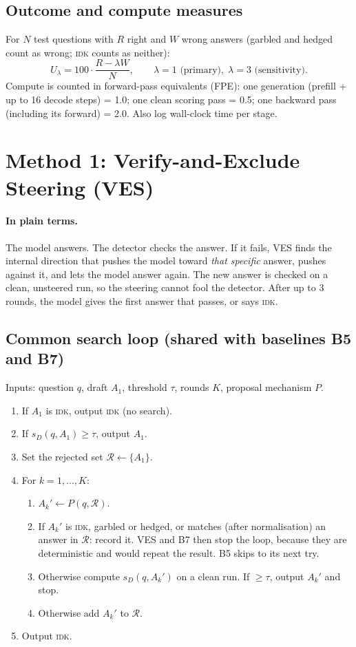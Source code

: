 \documentclass[11pt]{article}
\newcommand{\IDK}{\textsc{idk}}
\newcommand{\sD}{s_{D}}
\begin{document}
\subsection{Outcome and compute measures}
For $N$ test questions with $R$ right and $W$ wrong answers (garbled and hedged count as wrong; \IDK{} counts
as neither):
\[
U_\lambda = 100 \cdot \frac{R - \lambda W}{N}, \qquad \lambda = 1 \text{ (primary)}, \;\lambda = 3 \text{ (sensitivity)}.
\]
Compute is counted in forward-pass equivalents (FPE): one generation (prefill + up to 16 decode steps) = 1.0;
one clean scoring pass = 0.5; one backward pass (including its forward) = 2.0. Also log wall-clock time per stage.

\section{Method 1: Verify-and-Exclude Steering (VES)}

\paragraph{In plain terms.} The model answers. The detector checks the answer. If it fails, VES finds the
internal direction that pushes the model toward \emph{that specific} answer, pushes against it, and lets the
model answer again. The new answer is checked on a clean, unsteered run, so the steering cannot fool the
detector. After up to 3 rounds, the model gives the first answer that passes, or says \IDK.

\subsection{Common search loop (shared with baselines B5 and B7)}\label{sec:loop}
Inputs: question $q$, draft $A_1$, threshold $\tau$, rounds $K$, proposal mechanism $P$.
\begin{enumerate}
  \item If $A_1$ is \IDK, output \IDK{} (no search).
  \item If $\sD(q, A_1) \ge \tau$, output $A_1$.
  \item Set the rejected set $\mathcal{R} \leftarrow \{A_1\}$.
  \item For $k = 1, \dots, K$:
  \begin{enumerate}
    \item $A_k' \leftarrow P(q, \mathcal{R})$.
    \item If $A_k'$ is \IDK, garbled or hedged, or matches (after normalisation) an answer in $\mathcal{R}$:
          record it. VES and B7 then stop the loop, because they are deterministic and would repeat the
          result. B5 skips to its next try.
    \item Otherwise compute $\sD(q, A_k')$ on a clean run. If $\ge \tau$, output $A_k'$ and stop.
    \item Otherwise add $A_k'$ to $\mathcal{R}$.
  \end{enumerate}
  \item Output \IDK.
\end{enumerate}
\end{document}
